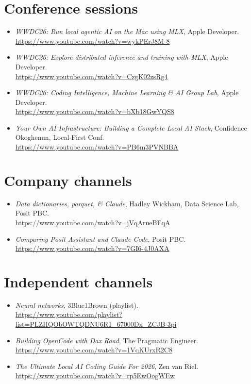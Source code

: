 \section{Conference sessions}

\begin{itemize}
  \item \emph{WWDC26: Run local agentic AI on the Mac using MLX}, Apple
    Developer.\\
    \url{https://www.youtube.com/watch?v=wykPErJ8M-8}
  \item \emph{WWDC26: Explore distributed inference and training with MLX},
    Apple Developer.\\
    \url{https://www.youtube.com/watch?v=CzgK02zsRg4}
  \item \emph{WWDC26: Coding Intelligence, Machine Learning \& AI Group Lab},
    Apple Developer.\\
    \url{https://www.youtube.com/watch?v=bXb18GwYQS8}
  \item \emph{Your Own AI Infrastructure: Building a Complete Local AI Stack},
    Confidence Okoghenun, Local-First Conf.\\
    \url{https://www.youtube.com/watch?v=PB6m3PVNBBA}
\end{itemize}

\section{Company channels}

\begin{itemize}
  \item \emph{Data dictionaries, parquet, \& Claude}, Hadley Wickham, Data
    Science Lab, Posit PBC.\\
    \url{https://www.youtube.com/watch?v=jVqArueBFqA}
  \item \emph{Comparing Posit Assistant and Claude Code}, Posit PBC.\\
    \url{https://www.youtube.com/watch?v=7GI6-4J0AXA}
\end{itemize}

\section{Independent channels}

\begin{itemize}
  \item \emph{Neural networks}, 3Blue1Brown (playlist).\\
    \url{https://www.youtube.com/playlist?list=PLZHQObOWTQDNU6R1_67000Dx_ZCJB-3pi}
  \item \emph{Building OpenCode with Dax Raad}, The Pragmatic Engineer.\\
    \url{https://www.youtube.com/watch?v=1VqKUrxR2C8}
  \item \emph{The Ultimate Local AI Coding Guide For 2026}, Zen van Riel.\\
    \url{https://www.youtube.com/watch?v=rp5EwOogWEw}
\end{itemize}


